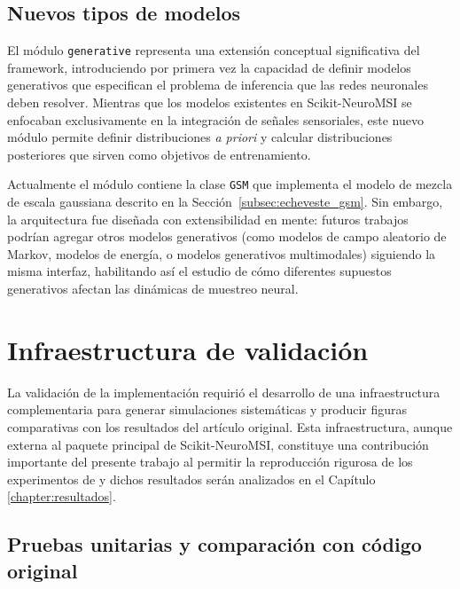 \subsection{Nuevos tipos de modelos}
\label{subsec:impl_modulo_generative}

El módulo \texttt{generative} representa una extensión conceptual significativa del framework, introduciendo por primera vez la capacidad de definir modelos generativos que especifican el problema de inferencia que las redes neuronales deben resolver. Mientras que los modelos existentes en Scikit-NeuroMSI se enfocaban exclusivamente en la integración de señales sensoriales, este nuevo módulo permite definir distribuciones \textit{a priori} y calcular distribuciones posteriores que sirven como objetivos de entrenamiento.

Actualmente el módulo contiene la clase \texttt{GSM} que implementa el modelo de mezcla de escala gaussiana descrito en la Sección~\ref{subsec:echeveste_gsm}. Sin embargo, la arquitectura fue diseñada con extensibilidad en mente: futuros trabajos podrían agregar otros modelos generativos (como modelos de campo aleatorio de Markov, modelos de energía, o modelos generativos multimodales) siguiendo la misma interfaz, habilitando así el estudio de cómo diferentes supuestos generativos afectan las dinámicas de muestreo neural.


\section{Infraestructura de validación}
\label{sec:impl_infraestructura}

La validación de la implementación requirió el desarrollo de una infraestructura complementaria para generar simulaciones sistemáticas y producir figuras comparativas con los resultados del artículo original. Esta infraestructura, aunque externa al paquete principal de Scikit-NeuroMSI, constituye una contribución importante del presente trabajo al permitir la reproducción rigurosa de los experimentos de \citet{echeveste2020cortical} y dichos resultados serán analizados en el Capítulo \ref{chapter:resultados}. 

\subsection{Pruebas unitarias y comparación con código original}
\label{subsec:impl_tests}

